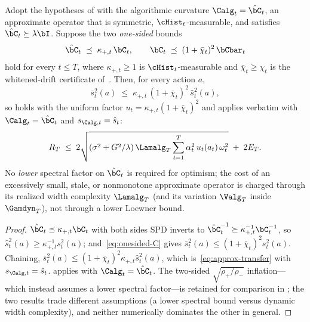 \begin{theorem}\label{thm:spectral-distortion}
Adopt the hypotheses of  with the algorithmic curvature
$\Calg_t=\hat\bC_t$, an approximate operator that is symmetric,
$\cHist_t$-measurable, and satisfies $\hat\bC_t\succeq\lambda\bI$.  Suppose
the two \emph{one-sided} bounds
\begin{equation}\label{eq:approx-onesided}
  \hat\bC_t \;\preceq\; \kappa_{+,t}\,\bC_t,
  \qquad
  \bC_t \;\preceq\; (1+\bar\chi_t)^2\,\bCbar_t
\end{equation}
hold for every $t\le T$, where $\kappa_{+,t}\ge1$ is $\cHist_t$-measurable
and $\bar\chi_t\ge\chi_t$ is the whitened-drift certificate
of~.  Then, for every action $a$,
\begin{equation}\label{eq:approx-transfer}
  \bar s_t^2(a)\;\le\;\kappa_{+,t}\,(1+\bar\chi_t)^2\,\hat s_t^2(a),
\end{equation}
so  holds with the uniform factor
$u_t=\kappa_{+,t}(1+\bar\chi_t)^2$ and  applies verbatim
with $\Calg_t=\hat\bC_t$ and $s_{\Calg,t}=\hat s_t$:
\[
  R_T\;\le\;2\sqrt{(\sigma^2+G^2/\lambda)\,\Lamalg_T
    \sum_{t=1}^T\alpha_t^2\,u_t(a_t)\,\omega_t^2}\;+\;2E_T .
\]
No \emph{lower} spectral factor on $\hat\bC_t$ is required for optimism; the
cost of an excessively small, stale, or nonmonotone approximate operator is
charged through its realized width complexity $\Lamalg_T$ (and its variation
$\Valg_T$ inside $\Gamdyn_T$), not through a lower Loewner bound.
\end{theorem}
\begin{proof}
$\hat\bC_t\preceq\kappa_{+,t}\bC_t$ with both sides SPD inverts to
$\hat\bC_t^{-1}\succeq\kappa_{+,t}^{-1}\bC_t^{-1}$, so
$\hat s_t^2(a)\ge\kappa_{+,t}^{-1}s_t^2(a)$; and~\eqref{eq:onesided-C} gives
$\bar s_t^2(a)\le(1+\bar\chi_t)^2 s_t^2(a)$.  Chaining,
$\bar s_t^2(a)\le(1+\bar\chi_t)^2\kappa_{+,t}\hat s_t^2(a)$, which
is~\eqref{eq:approx-transfer} with $s_{\Calg,t}=\hat s_t$.
 applies with $\Calg_t=\hat\bC_t$.  The two-sided
$\sqrt{\rho_+/\rho_-}$ inflation---which instead assumes a lower spectral
factor---is retained for comparison in ; the two results
trade different assumptions (a lower spectral bound versus dynamic width
complexity), and neither numerically dominates the other in general.
\end{proof}

